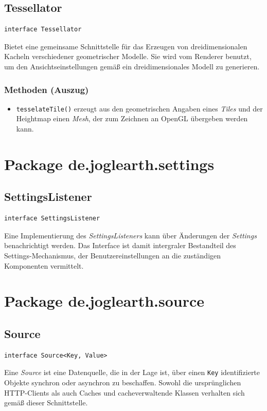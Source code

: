 \documentclass[10pt]{scrreprt}
\begin{document}
\subsection*{Tessellator}
\begin{lstlisting}
interface Tessellator
\end{lstlisting}
Bietet eine gemeinsame Schnittstelle für das Erzeugen von dreidimensionalen Kacheln verschiedener geometrischer Modelle. Sie wird vom Renderer benutzt, um den Ansichtseinstellungen gemäß ein dreidimensionales Modell zu generieren.\\
\subsubsection*{Methoden (Auszug)}
\begin{itemize}
\item \texttt{tesselateTile()} erzeugt aus den geometrischen Angaben eines \textit{Tiles} und der Heightmap einen \textit{Mesh}, der zum Zeichnen an OpenGL übergeben werden kann.
\end{itemize}

\newpage

\vspace{5mm}
\section{Package de.joglearth.settings}
\subsection*{SettingsListener}
\begin{lstlisting}
interface SettingsListener
\end{lstlisting}
Eine Implementierung des \textit{SettingsListeners} kann über Änderungen der \textit{Settings} benachrichtigt werden. Das Interface ist damit intergraler Bestandteil des Settings-Mechanismus, der Benutzereinstellungen an die zuständigen Komponenten vermittelt.\\


\vspace{5mm}
\section{Package de.joglearth.source}
\subsection*{Source}
\begin{lstlisting}
interface Source<Key, Value>
\end{lstlisting}
Eine \textit{Source} ist eine Datenquelle, die in der Lage ist, über einen \texttt{Key} identifizierte Objekte synchron oder asynchron zu beschaffen. Sowohl die ursprünglichen HTTP-Clients als auch Caches und cacheverwaltende Klassen verhalten sich gemäß dieser Schnittstelle.\\
\end{document}
